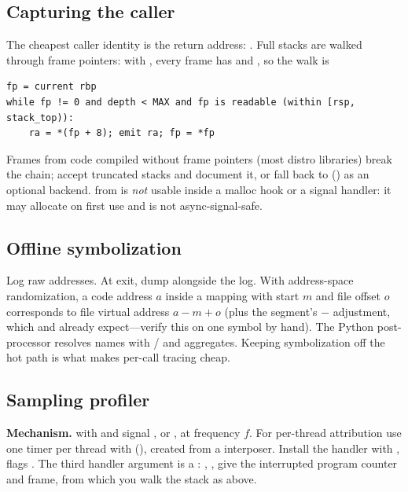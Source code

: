 \subsection{Capturing the caller}

The cheapest caller identity is the return address: . Full stacks are walked through frame pointers: with , every frame has  and , so the walk is
\begin{lstlisting}[style=plain]
fp = current rbp
while fp != 0 and depth < MAX and fp is readable (within [rsp, stack_top)):
    ra = *(fp + 8); emit ra; fp = *fp
\end{lstlisting}
Frames from code compiled without frame pointers (most distro libraries) break the chain; accept truncated stacks and document it, or fall back to  () as an optional backend.  from  is \emph{not} usable inside a malloc hook or a signal handler: it may allocate on first use and is not async-signal-safe.

\subsection{Offline symbolization}

Log raw addresses. At exit, dump  alongside the log. With address-space randomization, a code address $a$ inside a mapping with start $m$ and file offset $o$ corresponds to file virtual address $a - m + o$ (plus the segment's $-$ adjustment, which  and  already expect---verify this on one symbol by hand). The Python post-processor resolves names with / and aggregates. Keeping symbolization off the hot path is what makes per-call tracing cheap.

\subsection{Sampling profiler}

\textbf{Mechanism.}  with  and signal , or , at frequency $f$. For per-thread attribution use one timer per thread with  (), created from a  interposer. Install the handler with , flags . The third handler argument is a : , ,  give the interrupted program counter and frame, from which you walk the stack as above.

